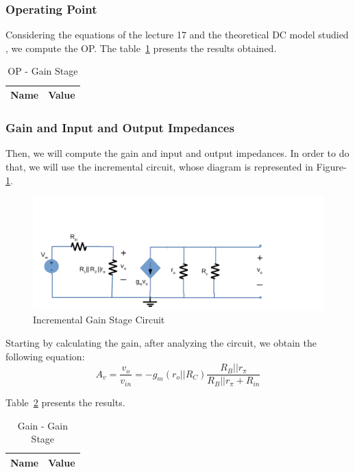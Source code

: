 \subsubsection{Operating Point}
Considering the equations of the lecture 17 and the theoretical DC model studied , we compute the OP. The table~\ref{tab:opgs} presents the results obtained.

\begin{table}[H]
  \centering
  \begin{tabular}{|l|r|}
     \hline    
    {\bf Name} & {\bf Value} \\ \hline   
    
  \end{tabular}
  \caption{OP - Gain Stage}
  \label{tab:opgs}
\end{table}

\subsubsection{Gain and Input and Output Impedances}
Then, we will compute the gain and input and output impedances. In order to do that, we will  use the incremental circuit, whose diagram is represented in Figure-\ref{fig:gsincrem}.

\begin{figure}[H] \centering
\includegraphics[width=0.8\linewidth]{incrementalgs.pdf}
\caption{Incremental Gain Stage Circuit}                         %
\label{fig:gsincrem}
\end{figure}

Starting by calculating the gain, after analyzing the circuit, we obtain the following equation: 
\begin{equation}
	A_v=\frac{v_o}{v_{in}}=-g_m(r_o||R_C)\frac{R_B||r_\pi}{R_B||r_\pi+R_{in}}
\end{equation}

Table~\ref{tab:avgs} presents the results.

\begin{table}[H]
  \centering
  \begin{tabular}{|l|r|}
     \hline    
    {\bf Name} & {\bf Value} \\ \hline   
    
  \end{tabular}
  \caption{Gain - Gain Stage}
  \label{tab:avgs}
\end{table}

